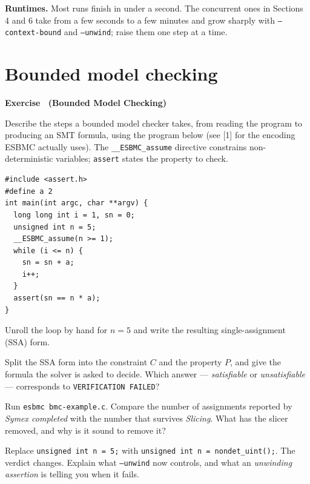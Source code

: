 \documentclass[11pt,a4paper]{article}
\newcommand{\esbmc}{ESBMC}
\newcommand{\flag}[1]{\texttt{\small #1}}
\newcounter{exc}
\renewcommand{\theexc}{\arabic{exc}}
\newenvironment{exercise}[2][]
  {\stepcounter{exc}\ifx\relax#1\relax\else\excref{#1}\fi%
   \medskip\noindent\textbf{Exercise \theexc\ (#2)}\par\nopagebreak\smallskip}
  {\par\medskip}
\begin{document}
\medskip
\noindent
\textbf{Runtimes.} Most runs finish in under a second. The concurrent ones in
Sections 4 and 6 take from a few seconds to a few minutes and grow sharply with
\flag{--context-bound} and \flag{--unwind}; raise them one step at a time.

\section{Bounded model checking}

\begin{exercise}{Bounded Model Checking}
Describe the steps a bounded model checker takes, from reading the program to
producing an SMT formula, using the program below (see [1] for the encoding
\esbmc{} actually uses). The \texttt{\_\_ESBMC\_assume}
directive constrains non-deterministic variables; \texttt{assert} states the
property to check.

\begin{lstlisting}
#include <assert.h>
#define a 2
int main(int argc, char **argv) {
  long long int i = 1, sn = 0;
  unsigned int n = 5;
  __ESBMC_assume(n >= 1);
  while (i <= n) {
    sn = sn + a;
    i++;
  }
  assert(sn == n * a);
}
\end{lstlisting}

\begin{parts}
  \item Unroll the loop by hand for $n = 5$ and write the resulting
        single-assignment (SSA) form.
  \item Split the SSA form into the constraint $C$ and the property $P$, and
        give the formula the solver is asked to decide. Which answer ---
        \emph{satisfiable} or \emph{unsatisfiable} --- corresponds to
        \texttt{VERIFICATION FAILED}?
  \item Run \texttt{esbmc bmc-example.c}. Compare the number of assignments
        reported by \emph{Symex completed} with the number that survives
        \emph{Slicing}. What has the slicer removed, and why is it sound to
        remove it?
  \item Replace \texttt{unsigned int n = 5;} with
        \texttt{unsigned int n = nondet\_uint();}. The verdict changes. Explain
        what \flag{--unwind} now controls, and what an
        \emph{unwinding assertion} is telling you when it fails.
\end{parts}
\end{exercise}
\end{document}
